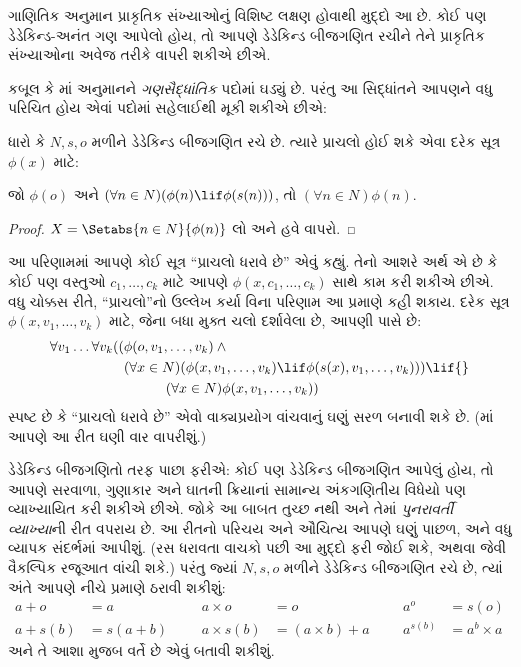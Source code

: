 ગાણિતિક અનુમાન પ્રાકૃતિક સંખ્યાઓનું વિશિષ્ટ લક્ષણ હોવાથી મુદ્દો આ છે.
કોઈ પણ ડેડેકિન્ડ-અનંત ગણ આપેલો હોય, તો આપણે ડેડેકિન્ડ બીજગણિત રચીને
તેને પ્રાકૃતિક સંખ્યાઓના અવેજ તરીકે વાપરી શકીએ છીએ.

કબૂલ કે માં અનુમાનને
\emph{ગણસૈદ્ધાંતિક} પદોમાં ઘડ્યું છે. પરંતુ આ સિદ્ધાંતને આપણને વધુ
પરિચિત હોય એવાં પદોમાં સહેલાઈથી મૂકી શકીએ છીએ:

\begin{cor}
ધારો કે $N, s, o$ મળીને ડેડેકિન્ડ બીજગણિત રચે છે. ત્યારે પ્રાચલો
હોઈ શકે એવા દરેક સૂત્ર $\phi(x)$ માટે:
\begin{center}
	જો $\phi(o)$ અને $(\forall {n} \in N)(\phi(n)\lif
	\phi({s}({n})))$, {તો} $(\forall n \in N)\phi(n)$.
\end{center}
\end{cor}

\begin{proof}
$X = \Setabs{n \in N}{\phi(n)}$ લો અને હવે
 વાપરો.
\end{proof}

આ પરિણામમાં આપણે કોઈ સૂત્ર ``પ્રાચલો ધરાવે છે'' એવું કહ્યું. તેનો
આશરે અર્થ એ છે કે કોઈ પણ વસ્તુઓ $c_1, \ldots, c_k$ માટે આપણે
$\phi(x, c_1, \ldots, c_k)$ સાથે કામ કરી શકીએ છીએ. વધુ ચોક્કસ રીતે,
``પ્રાચલો''નો ઉલ્લેખ કર્યા વિના પરિણામ આ પ્રમાણે કહી શકાય. દરેક સૂત્ર
$\phi(x, v_1, \ldots, v_k)$ માટે, જેના બધા મુક્ત ચલો દર્શાવેલા છે,
આપણી પાસે છે:
	\begin{align*}
			\forall v_1 \ldots \forall v_k((&\phi(o, v_1,\ldots, v_k) \land {}\\
			&	(\forall x \in N)(\phi(x,v_1, \ldots, v_k) \lif \phi(s(x), v_1,\ldots, v_k))) \lif {}\\
			&\hspace{3em} (\forall x \in N)\phi(x, v_1,\ldots, v_k))
	\end{align*}
સ્પષ્ટ છે કે ``પ્રાચલો ધરાવે છે'' એવો વાક્યપ્રયોગ વાંચવાનું ઘણું સરળ
બનાવી શકે છે. (માં આપણે આ રીત ઘણી વાર વાપરીશું.)

ડેડેકિન્ડ બીજગણિતો તરફ પાછા ફરીએ: કોઈ પણ ડેડેકિન્ડ બીજગણિત આપેલું
હોય, તો આપણે સરવાળા, ગુણાકાર અને ઘાતની ક્રિયાનાં સામાન્ય અંકગણિતીય
વિધેયો પણ વ્યાખ્યાયિત કરી શકીએ છીએ. જોકે આ બાબત તુચ્છ નથી અને તેમાં
\emph{પુનરાવર્તી વ્યાખ્યા}ની રીત વપરાય છે. આ રીતનો પરિચય અને ઔચિત્ય
આપણે ઘણું પાછળ, અને વધુ વ્યાપક સંદર્ભમાં આપીશું. (રસ ધરાવતા વાચકો
 પછી આ મુદ્દો ફરી જોઈ શકે, અથવા
\citealt[pp.~95--8]{Potter2004} જેવી વૈકલ્પિક રજૂઆત વાંચી શકે.) પરંતુ
જ્યાં $N, s, o$ મળીને ડેડેકિન્ડ બીજગણિત રચે છે, ત્યાં અંતે આપણે નીચે
પ્રમાણે ઠરાવી શકીશું:
\begin{align*}
	{a} + {o} &= {a} & & & {a} \times {o} &= {o} & & & {a}^{o} &= s(o)\\
{a} + {s}({b}) &= {s}({a}+{b}) &&& {a} \times {s}({b}) &= ({a}\times {b}) + {a}  & & & {a}^{{s}({b})} &= {a}^{b} \times {a}
\end{align*}
અને તે આશા મુજબ વર્તે છે એવું બતાવી શકીશું.
\endgroup

